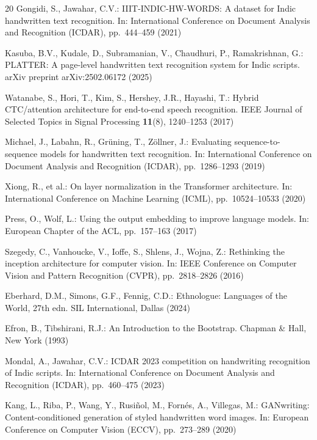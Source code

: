 \documentclass[pdflatex,sn-mathphys-num]{sn-jnl}
\begin{document}
\begin{thebibliography}{20}
Gongidi, S., Jawahar, C.V.: IIIT-INDIC-HW-WORDS: A dataset for Indic handwritten text recognition. In: International Conference on Document Analysis and Recognition (ICDAR), pp.~444--459 (2021)

Kasuba, B.V., Kudale, D., Subramanian, V., Chaudhuri, P., Ramakrishnan, G.: PLATTER: A page-level handwritten text recognition system for Indic scripts. arXiv preprint arXiv:2502.06172 (2025)

Watanabe, S., Hori, T., Kim, S., Hershey, J.R., Hayashi, T.: Hybrid CTC/attention architecture for end-to-end speech recognition. IEEE Journal of Selected Topics in Signal Processing \textbf{11}(8), 1240--1253 (2017)

Michael, J., Labahn, R., Gr{\"u}ning, T., Z{\"o}llner, J.: Evaluating sequence-to-sequence models for handwritten text recognition. In: International Conference on Document Analysis and Recognition (ICDAR), pp.~1286--1293 (2019)

Xiong, R., et al.: On layer normalization in the Transformer architecture. In: International Conference on Machine Learning (ICML), pp.~10524--10533 (2020)

Press, O., Wolf, L.: Using the output embedding to improve language models. In: European Chapter of the ACL, pp.~157--163 (2017)

Szegedy, C., Vanhoucke, V., Ioffe, S., Shlens, J., Wojna, Z.: Rethinking the inception architecture for computer vision. In: IEEE Conference on Computer Vision and Pattern Recognition (CVPR), pp.~2818--2826 (2016)

Eberhard, D.M., Simons, G.F., Fennig, C.D.: Ethnologue: Languages of the World, 27th edn. SIL International, Dallas (2024)

Efron, B., Tibshirani, R.J.: An Introduction to the Bootstrap. Chapman \& Hall, New York (1993)

Mondal, A., Jawahar, C.V.: ICDAR 2023 competition on handwriting recognition of Indic scripts. In: International Conference on Document Analysis and Recognition (ICDAR), pp.~460--475 (2023)

Kang, L., Riba, P., Wang, Y., Rusi{\~n}ol, M., Forn{\'e}s, A., Villegas, M.: GANwriting: Content-conditioned generation of styled handwritten word images. In: European Conference on Computer Vision (ECCV), pp.~273--289 (2020)

\end{thebibliography}
\end{document}
